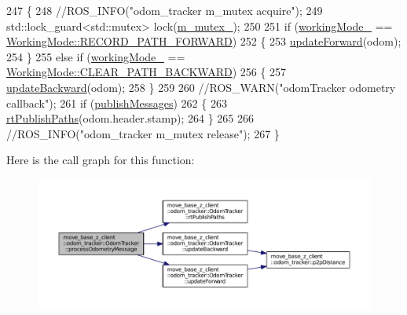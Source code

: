 \begin{DoxyCode}
247 \{
248     \textcolor{comment}{//ROS\_INFO("odom\_tracker m\_mutex acquire");}
249     std::lock\_guard<std::mutex> lock(\hyperlink{classmove__base__z__client_1_1odom__tracker_1_1OdomTracker_a63676e03be48b18ac48d5e2f11f19a25}{m\_mutex\_});
250 
251     \textcolor{keywordflow}{if} (\hyperlink{classmove__base__z__client_1_1odom__tracker_1_1OdomTracker_a39c97d7bf6003fde62e0bed1a221e3f0}{workingMode\_} == \hyperlink{namespacemove__base__z__client_1_1odom__tracker_adf3e5fc3644563922cc64a20a0197224a989d06a586bcf9520889228da7faa643}{WorkingMode::RECORD\_PATH\_FORWARD})
252     \{
253         \hyperlink{classmove__base__z__client_1_1odom__tracker_1_1OdomTracker_a12cee73239bc7685c645f8f52859b61f}{updateForward}(odom);
254     \}
255     \textcolor{keywordflow}{else} \textcolor{keywordflow}{if} (\hyperlink{classmove__base__z__client_1_1odom__tracker_1_1OdomTracker_a39c97d7bf6003fde62e0bed1a221e3f0}{workingMode\_} == \hyperlink{namespacemove__base__z__client_1_1odom__tracker_adf3e5fc3644563922cc64a20a0197224a0cf8f27617189e35619df3c18bda6274}{WorkingMode::CLEAR\_PATH\_BACKWARD})
256     \{
257         \hyperlink{classmove__base__z__client_1_1odom__tracker_1_1OdomTracker_ae613af99d85a8aa18c632e76efe41113}{updateBackward}(odom);
258     \}
259 
260     \textcolor{comment}{//ROS\_WARN("odomTracker odometry callback");}
261     \textcolor{keywordflow}{if} (\hyperlink{classmove__base__z__client_1_1odom__tracker_1_1OdomTracker_a7fa39bb2ddd9e60778687c854ea0c59c}{publishMessages})
262     \{
263         \hyperlink{classmove__base__z__client_1_1odom__tracker_1_1OdomTracker_a6ee06474c7aea4423a7937c8ebc193ad}{rtPublishPaths}(odom.header.stamp);
264     \}
265 
266     \textcolor{comment}{//ROS\_INFO("odom\_tracker m\_mutex release");}
267 \}
\end{DoxyCode}


Here is the call graph for this function\+:
\nopagebreak
\begin{figure}[H]
\begin{center}
\leavevmode
\includegraphics[width=350pt]{classmove__base__z__client_1_1odom__tracker_1_1OdomTracker_a79b9f1e3b15fa6ac82dd93ab78e23579_cgraph}
\end{center}
\end{figure}




